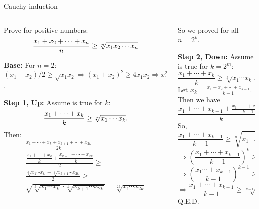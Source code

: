 \documentclass[9pt,aspectratio=169,handout]{beamer}
\begin{document}
\begin{frame}{Cauchy induction}
  \begin{columns}[T]
    \begin{column}{0.5\textwidth}
      \begin{problem}
        Prove for positive numbers:
        \[ \frac{x_1 + x_2 + \cdots + x_n}{n} \geq \sqrt[n]{x_1 x_2 \cdots x_n}
        \vspace*{-5px}
        \]
      \end{problem}\pause

      \textbf{Base:} For $n=2$: $(x_1 + x_2)/2 \geq \sqrt{x_1 x_2} \Rightarrow (x_1 + x_2)^2 \geq 4 x_1 x_2 \Rightarrow x_1^2 - 2x_1 x_2 + x_2^2 \geq 0 \Rightarrow (x_1 - x_2)^2 \geq 0$.\pause

      \smallskip
      \textbf{Step 1, Up:} Assume is true for $k$:
      \[ \frac{x_1 + \cdots + x_k}{k} \geq \sqrt[k]{x_1 \cdots x_k}.
      \vspace*{-5px}
      \]\pause
      Then:
      \begin{multline*}
        \frac{x_1 + \cdots + x_k + x_{k+1} + \cdots + x_{2k}}{2k} = \\
        \frac{\dfrac{x_1 + \cdots + x_k}{k} + \dfrac{x_{k+1} + \cdots + x_{2k}}{k}}{2} \geq \\
        \frac{\sqrt[k]{x_1 \cdots x_k} + \sqrt[k]{x_{k+1} \cdots x_{2k}}}{2} \geq \\
        \sqrt{\sqrt[k]{x_1 \cdots x_k} \cdot \sqrt[k]{x_{k+1} \cdots x_{2k}}} = 
        \sqrt[2k] {x_1 \cdots x_{2k}}
      \end{multline*}\pause
    \end{column}
    \begin{column}{0.5\textwidth}
      So we proved for all $n = 2^k$.\pause
      
      \textbf{Step 2, Down:} Assume is true for $k = 2^m$:
      \[ \frac{x_1 + \cdots + x_k}{k} \geq \sqrt[k]{x_1 \cdots x_k}.
      \]\pause
      Let $x_k=\frac{x_1+x_2+\cdots+x_{k-1}}{k-1}$. \pause
      Then we have
      \[
        \frac{x_1+\cdots+x_{k-1}+\frac{x_1+\cdots+x_{k-1}}{k-1}}{k}=
        \frac{x_1+\cdots+x_{k-1}}{k-1}
      \]\pause
      So,
      \[
        \frac{x_1+\cdots+x_{k-1}}{k-1}\ge \sqrt[n]{x_1\cdots x_{k-1}\cdot \frac{x_1+\cdots+x_{k-1}}{k-1}}
      \]
      \[\Rightarrow\left(\frac{x_1+\cdots+x_{k-1}}{k-1}\right)^k\ge x_1\cdots x_{k-1}\cdot \frac{x_1+\cdots+x_{k-1}}{k-1}\]
      \[\Rightarrow\left(\frac{x_1\cdots+x_{k-1}}{k-1}\right)^{k-1}\ge x_1\cdots x_{k-1}\]
      \[\Rightarrow \frac{x_1+\cdots+x_{k-1}}{k-1}\ge\sqrt[k-1]{x_1\cdots x_{k-1}}\]\pause
      \hfill Q.E.D.
    \end{column}
  \end{columns}
\end{frame}
\end{document}
